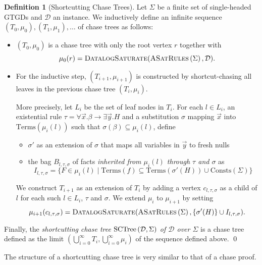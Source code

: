 \documentclass[12pt]{report}
\theoremstyle{plain}
\theoremstyle{definition}
\newtheorem{definition}[theorem]{Definition}
\def\Consts{{\mathrm{Consts}}}
\def\Terms{{\mathrm{Terms}}}
\newcommand{\ASatRules}[1]{\ensuremath{\normalfont{\textsc{ASatRules}} \left( #1 \right)}}
\newcommand{\SCTree}[2]{\ensuremath{\normalfont{\textrm{SCTree}} \left( #1, #2 \right)}}
\begin{document}
\begin{definition}[Shortcutting Chase Trees]
  Let $\Sigma$ be a finite set of single-headed GTGDs and $\mathcal{D}$ an instance. We inductively define an infinite sequence $(T_0, \mu_0), (T_1, \mu_1), \ldots$ of chase trees as follows:
  \begin{itemize}
    \item $(T_0, \mu_0)$ is a chase tree with only the root vertex $r$ together with $$\mu_0(r) = \textsc{DatalogSaturate}(\ASatRules{\Sigma}, \mathcal{D}).$$
    \item For the inductive step, $(T_{i + 1}, \mu_{i + 1})$ is constructed by shortcut-chasing all leaves in the previous chase tree $(T_i, \mu_i)$.
    
    More precisely, let $L_i$ be the set of leaf nodes in $T_i$. For each $l \in L_i$, an existential rule $\tau = \forall \vec{x}. \beta \rightarrow \exists \vec{y}. H$ and a substitution $\sigma$ mapping $\vec{x}$ into $\Terms(\mu_i(l))$ such that $\sigma(\beta) \subseteq \mu_i(l)$, define
    \begin{itemize}
      \item $\sigma'$ as an extension of $\sigma$ that maps all variables in $\vec{y}$ to fresh nulls
      \item the bag $B_{l, \tau, \sigma}$ of facts \emph{inherited from $\mu_i(l)$ through $\tau$ and $\sigma$} as $$I_{l, \tau, \sigma} = \{ F \in \mu_i(l) \mid \Terms(f) \subseteq \Terms(\sigma'(H)) \cup \Consts(\Sigma) \}$$
    \end{itemize}
    We construct $T_{i+1}$ as an extension of $T_i$ by adding a vertex $c_{l, \tau, \sigma}$ as a child of $l$ for each such $l \in L_i$, $\tau$ and $\sigma$. We extend $\mu_i$ to $\mu_{i+1}$ by setting $$\mu_{i+1}(c_{l, \tau, \sigma}) = \textsc{DatalogSaturate}(\ASatRules{\Sigma}, \{ \sigma'(H) \} \cup I_{l, \tau, \sigma}).$$
  \end{itemize}
  Finally, the \emph{shortcutting chase tree $\SCTree{\mathcal{D}}{\Sigma}$ of $\mathcal{D}$ over $\Sigma$} is a chase tree defined as the limit $(\bigcup_{i = 0}^\infty T_i, \bigcup_{i = 0}^\infty \mu_i)$ of the sequence defined above.
  \qed
\end{definition}


The structure of a shortcutting chase tree is very similar to that of a chase proof.
\end{document}
